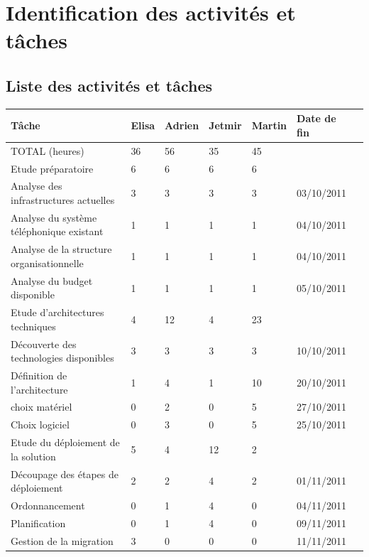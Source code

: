\section{Identification des activités et tâches}
\subsection{Liste des activités et tâches}


\begin{tabular}{|l|l|l|l|l|l|c|}
\hline	
\rowcolor{EnTete} \textbf{Tâche} & \textbf{Elisa} & \textbf{Adrien} & \textbf{Jetmir} & \textbf{Martin} & \textbf{Date de fin} \\ \hline
\rowcolor{Total} TOTAL (heures) 			&	36	&	56	&	35	&	45	&	\\ \hline

\rowcolor{Activite} Etude préparatoire 		& 	6 	&	6	&	6	&	6	&	\\ \hline
Analyse des infrastructures actuelles		&	3	&	3	&	3	&	3	&	03/10/2011 	\\ \hline
Analyse du système téléphonique existant	& 	1 	& 	1 	&	1	&	1	&	04/10/2011 	\\ \hline
Analyse de la structure organisationnelle	&	1	&	1	&	1	&	1	&	04/10/2011  \\ \hline
Analyse du budget disponible				& 	1	&	1	&	1	&	1	&	05/10/2011 	\\ \hline

\rowcolor{Activite} Etude d'architectures techniques	&	4	&	12	&	4	&	23	& 	\\ \hline
Découverte des technologies disponibles 	&	3	&	3	&	3	&	3	&	10/10/2011  \\ \hline
Définition de l'architecture				&	1	&	4	&	1	&	10	&	20/10/2011	\\ \hline
choix matériel 								&	0	&	2	&	0	&	5	&	27/10/2011	\\ \hline
Choix logiciel								&	0	&	3	&	0	&	5	&	25/10/2011  \\ \hline

\rowcolor{Activite} Etude du déploiement de la solution	&	5	&	4	&	12	&	2	& 	\\ \hline
Découpage des étapes de déploiement			&	2	&	2	&	4	&	2	&	01/11/2011	\\ \hline
Ordonnancement								&	0	&	1	&	4	&	0	&	04/11/2011	\\ \hline
Planification								&	0	&	1	&	4	&	0	&	09/11/2011 	\\ \hline
Gestion de la migration						&	3	&	0	&	0	&	0	&	11/11/2011	\\ \hline


\end{tabular}

